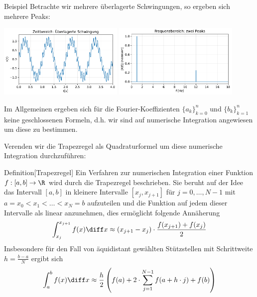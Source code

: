 \begin{colbox}{Beispiel}
  Betrachte wir mehrere überlagerte Schwingungen, so ergeben sich mehrere Peaks:
  
  \begin{center}
    \includegraphics[width=0.45\textwidth]{figures/zeit_sinus_summe.pdf}
    \hfill
    \includegraphics[width=0.45\textwidth]{figures/spektrum_sinus_summe.pdf}
  \end{center}

\end{colbox}

Im Allgemeinen ergeben sich für die Fourier-Koeffizienten $\{a_k\}_{k=0}^n$ und $\{b_k\}_{k=1}^n$ keine geschlossenen 
Formeln, d.h. wir sind auf numerische Integration angewiesen um diese zu bestimmen.

Verenden wir die Trapezregel als Quadraturformel um diese numerische Integration durchzuführen:

\begin{colbox}{Definition}[Trapezregel]
  Ein Verfahren zur numerischen Integration einer Funktion $f:[a,b]\to\R$ wird durch die Trapezregel beschrieben. Sie 
  beruht auf der Idee das Intervall $[a,b]$ in kleinere Intervalle $[x_j, x_{j+1}]$ für $j=0,\dots,N-1$ mit 
  $a=x_0<x_1<\dots<x_N=b$ aufzuteilen und die Funktion auf jedem dieser Intervalle als linear anzunehmen, 
  dies ermöglicht folgende Annäherung 
  \begin{align*}
    \int_{x_j}^{x_{j+1}} f(x) \diff x \approx (x_{j+1}-x_j)\cdot\dfrac{f(x_{j+1})+f(x_j)}{2}
  \end{align*}
  Insbesondere für den Fall von äquidistant gewählten Stützstellen mit Schrittweite $h=\tfrac{b-a}{N}$ ergibt sich
  \begin{align*}
    \int_{a}^{b} f(x) \diff x \approx \dfrac{h}{2}\left(f(a) + 2\cdot\sum_{j=1}^{N-1}f(a + h\cdot j) + f(b) \right)
  \end{align*}
\end{colbox}

